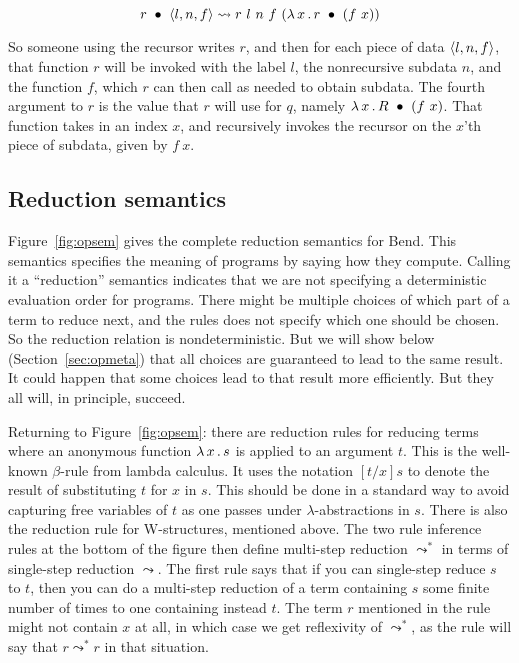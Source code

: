 \documentclass{article}
\begin{document}
\[
\wrec{r}{\ctor{l}{n}{f}} \leadsto r\ l\ n\ f\ (\lam{x}{\wrec{r}{(f\ x)}})
\]

\noindent So someone using the recursor writes $r$, and then for each
piece of data $\langle l , n, f \rangle$, that function $r$ will be invoked with
the label $l$, the nonrecursive subdata $n$, and the function $f$,
which $r$ can then call as needed to obtain subdata.  The fourth
argument to $r$ is the value that $r$ will use for $q$, namely
$\lambda\, x\, .\, R\ \bullet\ (f\ x)$.  That function takes in an index $x$, and
recursively invokes the recursor on the $x$'th piece of subdata, given
by $f\ x$.  


\subsection{Reduction semantics}

Figure~\ref{fig:opsem} gives the complete reduction semantics for
Bend.  This semantics specifies the meaning of programs by saying how
they compute.  Calling it a ``reduction'' semantics indicates that we
are not specifying a deterministic evaluation order for programs.
There might be multiple choices of which part of a term to reduce
next, and the rules does not specify which one should be chosen.  So
the reduction relation is nondeterministic.  But we will show below
(Section~\ref{sec:opmeta}) that all choices are guaranteed to lead to
the same result.  It could happen that some choices lead to that
result more efficiently.  But they all will, in principle, succeed.

Returning to Figure~\ref{fig:opsem}: there are reduction rules for
reducing terms where an anonymous function $\lambda\, x\, .\, s$ is applied to
an argument $t$.  This is the well-known $\beta$-rule from lambda
calculus.  It uses the notation $[t/x]s$ to denote the result of
substituting $t$ for $x$ in $s$.  This should be done in a standard
way to avoid capturing free variables of $t$ as one passes under
$\lambda$-abstractions in $s$.  There is also the reduction rule for
W-structures, mentioned above.  The two rule inference rules
at the bottom of the figure then define multi-step reduction $\leadsto^*$
in terms of single-step reduction $\leadsto$.  The first rule says
that if you can single-step reduce $s$ to $t$, then you can do a multi-step
reduction of a term containing $s$ some finite number of times to one
containing instead $t$.  The term $r$ mentioned in the rule might
not contain $x$ at all, in which case we get reflexivity of $\leadsto^*$,
as the rule will say that $r \leadsto^* r$ in that situation.
\end{document}
